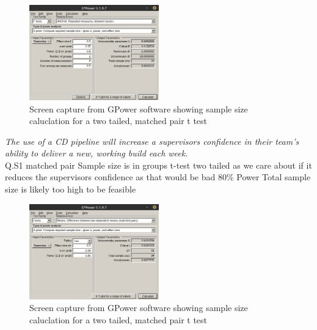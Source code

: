 \documentclass[lettersize,journal]{IEEEtran}
\begin{document}
        \begin{figure}[h!]
            \includegraphics[width=0.5\textwidth]{Images/ANOVA_2.png}
            \caption{Screen capture from GPower software showing sample size caluclation for a two tailed, matched pair t test}
            \label{ANOVArepeatedbetween}
        \end{figure}

        \textit{The use of a CD pipeline will increase a supervisors confidence in their team's ability to deliver a new, working build each week.} \\
            Q.S1
            matched pair
            Sample size is in groups
            t-test
            two tailed as we care about if it reduces the supervisors confidence as that would be bad
            80\% Power
            Total sample size is likely too high to be feasible
            \begin{figure}[h!]
                \includegraphics[width=0.5\textwidth]{Images/GPower_Matched.png}
                \caption{Screen capture from GPower software showing sample size caluclation for a two tailed, matched pair t test}
                \label{twotailmatchedpair}
            \end{figure}
\end{document}

